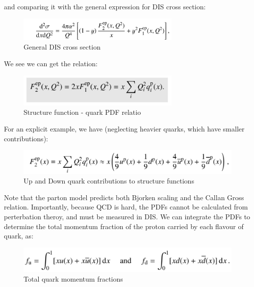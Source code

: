         and comparing it with the general expression for DIS cross section:
        
                
        \begin{figure}[H]
            \centering
            \includegraphics[width=8cm]{NuclearPhysics/modules/lepton-scattering/pics/inelastic-ep/inel-general.PNG}
            \caption{General DIS cross section}
        \end{figure}
        We see we can get the relation:
        
                
        \begin{figure}[H]
            \centering
            \includegraphics[width=8cm]{NuclearPhysics/modules/lepton-scattering/pics/inelastic-ep/f2-sum-q.PNG}
            \caption{Structure function - quark PDF relatio}
        \end{figure}
        
        For an explicit example, we have (neglecting heavier quarks, which have smaller contributions):
        
                
        \begin{figure}[H]
            \centering
            \includegraphics[width=12cm]{NuclearPhysics/modules/lepton-scattering/pics/inelastic-ep/example-f2.PNG}
            \caption{Up and Down quark contributions to structure functions}
        \end{figure}
        
        Note that the parton model predicts both Bjorken scaling and the Callan Gross relation. Importantly, because QCD is hard, the PDFs cannot be calculated from perterbation theroy, and must be measured in DIS. We can integrate the PDFs to determine the total momentum fraction of the proton carried by each flavour of quark, as:
        
                
        \begin{figure}[H]
            \centering
            \includegraphics[width=12cm]{NuclearPhysics/modules/lepton-scattering/pics/inelastic-ep/integrated-ud.PNG}
            \caption{Total quark momentum fractions}
        \end{figure}
        
